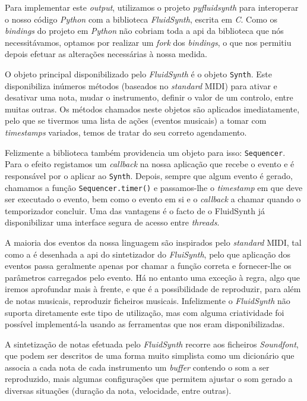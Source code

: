 Para implementar este \textit{output}, utilizamos o projeto \textit{pyfluidsynth}\cite{pyfluidsynth} para interoperar o nosso código \textit{Python} com a biblioteca \textit{FluidSynth}, escrita em \textit{C}. Como os \textit{bindings} do projeto em \textit{Python} não cobriam toda a \acrshort{api} da biblioteca que nós necessitávamos, optamos por realizar um \textit{fork} dos \textit{bindings}, o que nos permitiu depois efetuar as alterações necessárias à nossa medida.

O objeto principal disponibilizado pelo \textit{FluidSynth} é o objeto \texttt{Synth}. Este disponibiliza inúmeros métodos (baseados no \textit{standard} MIDI) para ativar e desativar uma nota, mudar o instrumento, definir o valor de um controlo, entre muitas outras. Os métodos chamados neste objetos são aplicados imediatamente, pelo que se tivermos uma lista de ações (eventos musicais) a tomar com \textit{timestamps} variados, temos de tratar do seu correto agendamento.

Felizmente a biblioteca também providencia um objeto para isso: \texttt{Sequencer}.  Para o efeito registamos um \textit{callback} na nossa aplicação que recebe o evento e é responsável por o aplicar ao \texttt{Synth}. Depois, sempre que algum evento é gerado, chamamos a função \texttt{Sequencer.timer()} e passamos-lhe o \textit{timestamp} em que deve ser executado o evento, bem como o evento em si e o \textit{callback} a chamar quando o temporizador concluir. Uma das vantagens é o facto de o FluidSynth já disponibilizar uma interface segura de acesso entre \textit{threads}\cite{henningsson2011fluidsynth}.

A maioria dos eventos da nossa linguagem são inspirados pelo \textit{standard} MIDI, tal como a é desenhada a \acrshort{api} do sintetizador do \textit{FluiSynth}, pelo que aplicação dos eventos passa geralmente apenas por chamar a função correta e fornecer-lhe os parâmetros carregados pelo evento. Há no entanto uma exceção à regra, algo que iremos aprofundar mais à frente, e que é a possibilidade de reproduzir, para além de notas musicais, reproduzir ficheiros musicais. Infelizmente o \textit{FluidSynth} não suporta diretamente este tipo de utilização, mas com alguma criatividade foi possível implementá-la usando as ferramentas que nos eram disponibilizadas.

A sintetização de notas efetuada pelo \textit{FluidSynth} recorre aos ficheiros \textit{Soundfont}, que podem ser descritos de uma forma muito simplista como um dicionário que associa a cada nota de cada instrumento um \textit{buffer} contendo o som a ser reproduzido, mais algumas configurações que permitem ajustar o som gerado a diversas situações (duração da nota, velocidade, entre outras).

